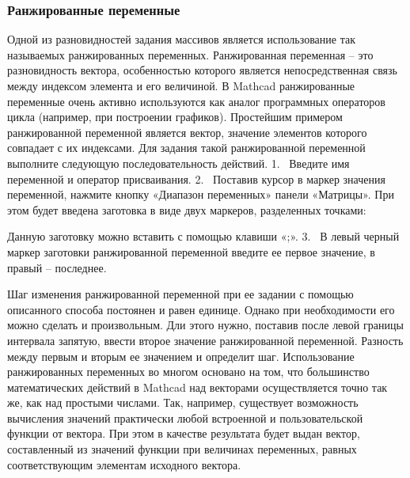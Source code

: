

\subsubsection*{Ранжированные переменные}
Одной из разновидностей задания массивов является использование так называемых ранжированных переменных. Ранжированная переменная – это разновидность вектора, особенностью которого является непосредственная связь между индексом элемента и его величиной. В Mathcad ранжированные переменные очень активно используются как аналог программных операторов цикла (например, при построении графиков).
Простейшим примером ранжированной переменной является вектор, значение элементов которого совпадает с их индексами. Для задания такой ранжированной переменной выполните следующую последовательность действий.
1.  Введите имя переменной и оператор присваивания.
2.  Поставив курсор в маркер значения переменной, нажмите кнопку «Диапазон переменных» панели «Матрицы». При этом будет введена заготовка в виде двух маркеров, разделенных точками:

Данную заготовку можно вставить с помощью клавиши «;».
3.  В левый черный маркер заготовки ранжированной переменной введите ее первое значение, в правый – последнее.

Шаг изменения ранжированной переменной при ее задании с помощью описанного способа постоянен и равен единице. Однако при необходимости его можно сделать и произвольным. Дли этого нужно, поставив после левой границы интервала запятую, ввести второе значение ранжированной переменной. Разность между первым и вторым ее значением и определит шаг. 
Использование ранжированных переменных во многом основано на том, что большинство математических действий в Mathcad над векторами осуществляется точно так же, как над простыми числами. Так, например, существует возможность вычисления значений практически любой встроенной и пользовательской функции от вектора. При этом в качестве результата будет выдан вектор, составленный из значений функции при величинах переменных, равных соответствующим элементам исходного вектора.


